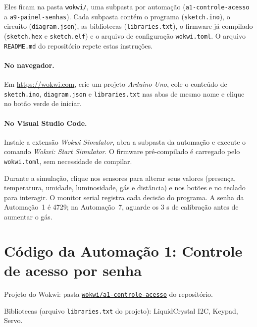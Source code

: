 \documentclass[12pt]{article}
\newcommand{\repositorio}{https://github.com/santanathalles76-tech/Trabalho-sistemas-embarcadosA2}
\newcommand{\simlink}[1]{\href{\repositorio/tree/main/wokwi/#1}{\texttt{wokwi/#1}}}
\begin{document}
\noindent Eles ficam na pasta \texttt{wokwi/}, uma subpasta por automação (\texttt{a1-controle-acesso} a \texttt{a9-painel-senhas}). Cada subpasta contém o programa (\texttt{sketch.ino}), o circuito (\texttt{diagram.json}), as bibliotecas (\texttt{libraries.txt}), o firmware já compilado (\texttt{sketch.hex} e \texttt{sketch.elf}) e o arquivo de configuração \texttt{wokwi.toml}. O arquivo \texttt{README.md} do repositório repete estas instruções.

\paragraph{No navegador.} Em \url{https://wokwi.com}, crie um projeto \emph{Arduino Uno}, cole o conteúdo de \texttt{sketch.ino}, \texttt{diagram.json} e \texttt{libraries.txt} nas abas de mesmo nome e clique no botão verde de iniciar.

\paragraph{No Visual Studio Code.} Instale a extensão \emph{Wokwi Simulator}, abra a subpasta da automação e execute o comando \emph{Wokwi: Start Simulator}. O firmware pré-compilado é carregado pelo \texttt{wokwi.toml}, sem necessidade de compilar.

Durante a simulação, clique nos sensores para alterar seus valores (presença, temperatura, umidade, luminosidade, gás e distância) e nos botões e no teclado para interagir. O monitor serial registra cada decisão do programa. A senha da Automação~1 é 4729; na Automação~7, aguarde os 3 s de calibração antes de aumentar o gás.

\section{Código da Automação 1: Controle de acesso por senha}\label{ap:a1}

\noindent Projeto do Wokwi: pasta \simlink{a1-controle-acesso} do repositório.

\noindent Bibliotecas (arquivo \texttt{libraries.txt} do projeto): LiquidCrystal I2C, Keypad, Servo.
\end{document}
